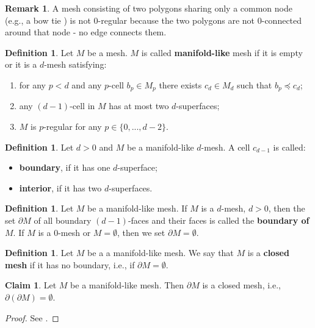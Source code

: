 \documentclass{elsarticle}
\theoremstyle{definition}
\newtheorem{claim}[theorem]{Claim}
\newtheorem{definition}[theorem]{Definition}
\newtheorem{remark}[theorem]{Remark}
\begin{document}
\begin{remark}
  A mesh consisting of two polygons sharing only a common node (e.g., a bow tie ) is not $0$-regular because the two polygons are not $0$-connected around that node - no edge connects them.
\end{remark}
\begin{definition}
\label{thm:mesh_manifold_like}
  Let $M$ be a mesh. $M$ is called \textbf{manifold-like} mesh if it is empty or it is a $d$-mesh satisfying:
  \begin{enumerate}
    \item
      for any $p < d$ and any $p$-cell $b_p \in M_p$ there exists $c_d \in M_d$ such that $b_p \preceq c_d$;
    \item
      any $(d - 1)$-cell in $M$ has at most two $d$-superfaces;
    \item
      $M$ is $p$-regular for any $p \in \{0, ..., d - 2\}$.
  \end{enumerate}
\end{definition}
\begin{definition}
  Let $d > 0$ and $M$ be a manifold-like $d$-mesh. A cell $c_{d - 1}$ is called:
  \begin{itemize}
    \item
      \textbf{boundary}, if it has one $d$-superface;
    \item
      \textbf{interior}, if it has two $d$-superfaces.
  \end{itemize}
\end{definition}
\begin{definition}
\label{thm:topological_boundary}
  Let $M$ be a manifold-like mesh. If $M$ is a $d$-mesh, $d > 0$, then the set $\partial M$ of all boundary $(d - 1)$-faces and their faces is called the \textbf{boundary of $M$}. If $M$ is a $0$-mesh or $M = \emptyset$, then we set $\partial M = \emptyset$.
\end{definition}
\begin{definition}
  Let $M$ be a a manifold-like mesh. We say that $M$ is a \textbf{closed mesh} if it has no boundary, i.e., if $\partial M = \emptyset$.
\end{definition}
\begin{claim}
  Let $M$ be a manifold-like mesh. Then $\partial M$ is a closed mesh, i.e., $\partial(\partial M) = \emptyset$.
\end{claim}
\begin{proof}
  See \cite[Theorem 7.2]{chen2014digital}.
\end{proof}
\end{document}
